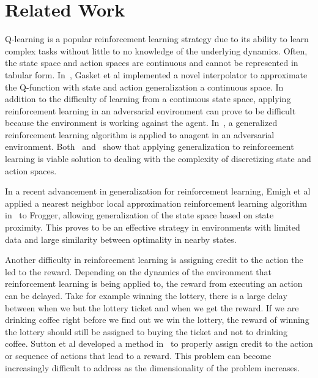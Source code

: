 \section{Related Work}

Q-learning is a popular reinforcement learning strategy due to its ability to learn complex tasks without little to no knowledge of the underlying dynamics. Often, the state space and action spaces are continuous and cannot be represented in tabular form. In~\cite{gaskett}, Gasket et al implemented a novel interpolator to approximate the Q-function with state and action generalization a continuous space. In addition to the difficulty of learning from a continuous state space, applying reinforcement learning in an adversarial environment can prove to be difficult because the environment is working against the agent. In~\cite{uther}, a generalized reinforcement learning algorithm is applied to anagent in an adversarial environment. Both~\cite{gaskett} and~\cite{uther} show that applying generalization to reinforcement learning is viable solution to dealing with the complexity of discretizing state and action spaces. 

In a recent advancement in generalization for reinforcement learning, Emigh et al applied a nearest neighbor local approximation reinforcement learning algorithm in~\cite{emigh} to Frogger, allowing generalization of the state space based on state proximity. This proves to be an effective strategy in environments with limited data and large similarity between optimality in nearby states.

Another difficulty in reinforcement learning is assigning credit to the action the led to the reward. Depending on the dynamics of the environment that reinforcement learning is being applied to, the reward from executing an action can be delayed. Take for example winning the lottery, there is a large delay between when we but the lottery ticket and when we get the reward. If we are drinking coffee right before we find out we win the lottery, the reward of winning the lottery should still be assigned to buying the ticket and not to drinking coffee. Sutton et al developed a method in~\cite{sutton} to properly assign credit to the action or sequence of actions that lead to a reward. This problem can become increasingly difficult to address as the dimensionality of the problem increases.       
